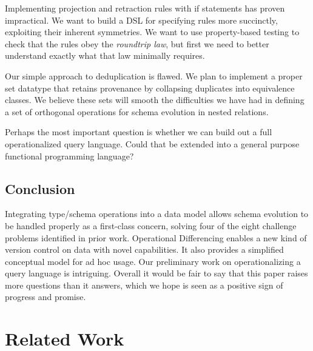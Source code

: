 \documentclass[english,submission]{programming}
\theoremstyle{definition}
\begin{document}
Implementing projection and retraction rules with if statements has proven impractical. We want to build a DSL for specifying rules more succinctly, exploiting their inherent symmetries.
We want to use property-based testing to check that the rules obey the \textit{roundtrip law}, but first we need to better understand exactly what that law minimally requires.

Our simple approach to deduplication is flawed. We plan to implement a proper set datatype that retains provenance by collapsing duplicates into equivalence classes. We believe these sets will smooth the difficulties we have had in defining a set of orthogonal operations for schema evolution in nested relations.

Perhaps the most important question is whether we can build out a full operationalized query language. Could that be extended into a general purpose functional programming language?


\subsection{Conclusion}

Integrating type/schema operations into a data model allows schema evolution to be handled properly as a first-class concern,
solving four of the eight challenge problems identified in prior work.
Operational Differencing enables a new kind of version control on data with novel capabilities. It also provides a simplified conceptual model for ad hoc usage.
Our preliminary work on operationalizing a query language is intriguing.
Overall it would be fair to say that this paper raises more questions than it answers, which we hope is seen as a positive sign of progress and promise.



\section{Related Work}



\end{document}
